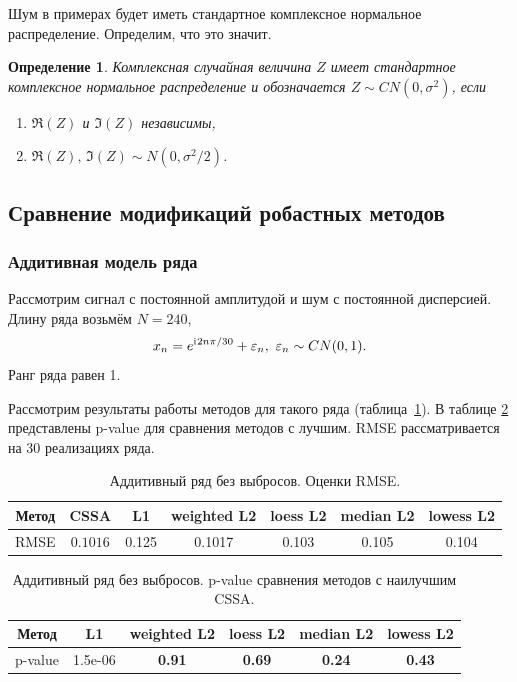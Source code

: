 \documentclass[specialist,
               substylefile = spbu.rtx,
               subf,href,colorlinks=true, 12pt]{disser}
\newtheorem*{def*}{Определение}
\begin{document}
Шум в примерах будет иметь стандартное комплексное нормальное распределение. Определим, что это значит.
\begin{def*}
	Комплексная случайная величина $Z$ имеет стандартное комплексное нормальное распределение и обозначается $Z \sim CN(0, \sigma^2)$, если
	\begin{enumerate}
		\item $\Re(Z)$ и $\Im(Z)$ независимы,
		\item $\Re(Z), \, \Im(Z) \sim N(0, \sigma^2/2)$.
	\end{enumerate}
\end{def*}

\subsection{Сравнение модификаций робастных методов}

\subsubsection{Аддитивная модель ряда}

Рассмотрим сигнал с постоянной амплитудой и шум с постоянной дисперсией.
Длину ряда возьмём $N = 240$,
$$x_n = e^{\mathrm{i}\mkern1mu 2n\pi/30} + \varepsilon_n, ~ \varepsilon_n \sim CN(0,1).$$
Ранг ряда равен 1.

Рассмотрим результаты работы методов для такого ряда (таблица~\ref{tab1}). В таблице \ref{tab: pval1} представлены p-value для сравнения методов с лучшим. RMSE рассматривается на 30 реализациях ряда.

\begin{table}[H]
	\begin{center}
		\caption{Аддитивный ряд без выбросов. Оценки RMSE.}
		\label{tab1}
		\begin{tabular}{|c|c|c|c|c|c|c|}
			\hline
			Метод	& CSSA & L1 & weighted L2 & loess L2 & median L2 & lowess L2 \\
			\hline
			RMSE & $\mathbf{0.1016}$  & 0.125  & 0.1017 & 0.103 & 0.105 & 0.104\\
			\hline
		\end{tabular}
	\end{center}
\end{table}

\begin{table}[H]
	\caption{Аддитивный ряд без выбросов. p-value сравнения методов с наилучшим CSSA.}
	\label{tab: pval1}
	\begin{center}
		\begin{tabular}{|c|c|c|c|c|c|}
			\hline
			Метод & L1 & weighted L2 & loess L2 & median L2 & lowess L2  \\
			\hline
			p-value & 1.5e-06   & \textbf{0.91} & \textbf{0.69}  & \textbf{0.24} & \textbf{0.43}  \\
			\hline
		\end{tabular}
	\end{center}
\end{table}
\end{document}
